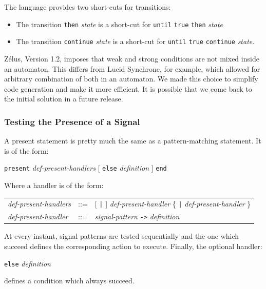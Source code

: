 \documentclass[11pt,titlepage,twoside]{report}
\newcommand{\zelus}{{\sf Z\'elus}}
\newcommand{\lucy}{{\sf Lucid Synchrone}}
\newcommand{\Then}{\mbox{{\tt then}}}
\newcommand{\Until}{\mbox{\tt until}}
\newcommand{\Continue}{\mbox{\tt continue}}
\newcommand{\term}[1]{{\tt #1}}
\newcommand{\nterm}[1]{{\em #1}}
\begin{document}
The language provides two short-cuts for transitions:

\begin{itemize}
\item
  The transition \term{\Then} \nterm{state} is a short-cut for
  \term{\Until} {\tt true}
  \term{\Then} \nterm{state}
\item
  The transition \term{\Continue} \nterm{state} is a short-cut
  for \term{\Until} {\tt true} \term{\Continue} \nterm{state}.
\end{itemize}

\zelus, Version 1.2, imposes that weak and strong conditions are not mixed inside
an automaton. This differs from \lucy, for example, which allowed for arbitrary
combination of both in an automaton. We made this choice to simplify code
generation and make it more efficient. It is possible that we come back to
the initial solution in a future release.

\subsubsection{Testing the Presence of a Signal}

A present statement is pretty much the same as a pattern-matching
statement. It is of the form: 
\begin{center}
  \term{present} \nterm{def-present-handlers} [ \term{else} \nterm{definition} ]
  \term{end}
\end{center}
Where a handler is of the form:
\begin{center}
\begin{tabular}{lcl}
\nterm{def-present-handlers}
   & ::=        & [ \term{|} ] \nterm{def-present-handler}
                  \{ \term{|} \nterm{def-present-handler} \} 
\\
\nterm{def-present-handler}
   & ::=        & \nterm{signal-pattern} \term{->} \nterm{definition}
\end{tabular}
\end{center}
At every instant, signal patterns are tested sequentially and the one which succeed
defines the corresponding action to execute. Finally, the optional handler:
\begin{center} 
  \term{else} \nterm{definition}
\end{center}
defines a condition which always succeed.
\end{document}
